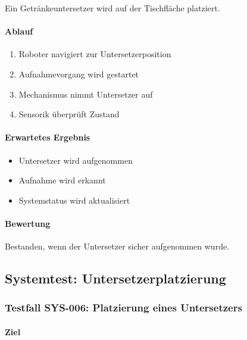 Ein Getränkeuntersetzer wird auf der Tischfläche platziert.

\paragraph{Ablauf}\label{ablauf-28}

\begin{enumerate}
\def\labelenumi{\arabic{enumi}.}
\tightlist
\item
  Roboter navigiert zur Untersetzerposition
\item
  Aufnahmevorgang wird gestartet
\item
  Mechanismus nimmt Untersetzer auf
\item
  Sensorik überprüft Zustand
\end{enumerate}

\paragraph{Erwartetes Ergebnis}\label{erwartetes-ergebnis-28}

\begin{itemize}
\tightlist
\item
  Untersetzer wird aufgenommen
\item
  Aufnahme wird erkannt
\item
  Systemstatus wird aktualisiert
\end{itemize}

\paragraph{Bewertung}\label{bewertung-28}

Bestanden, wenn der Untersetzer sicher aufgenommen wurde.

\subsection{Systemtest:
Untersetzerplatzierung}\label{systemtest-untersetzerplatzierung}

\subsubsection{Testfall SYS-006: Platzierung eines
Untersetzers}\label{testfall-sys-006-platzierung-eines-untersetzers}

\paragraph{Ziel}\label{ziel-29}

